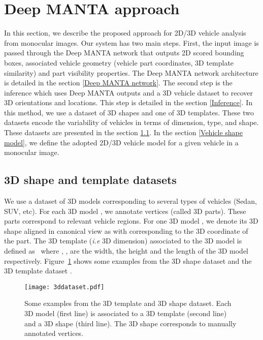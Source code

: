 \documentclass[10pt,twocolumn,letterpaper]{article}
\begin{document}
\section{Deep MANTA approach}  
\label{sec:method}

In this section, we describe the proposed approach for 2D/3D vehicle analysis from monocular images. Our system has two main steps. First, the input image is passed through the Deep MANTA network that outputs 2D scored bounding boxes, associated vehicle geometry (vehicle part coordinates, 3D template similarity) and part visibility properties. The Deep MANTA network architecture is detailed in the section \ref{Deep MANTA network}. The second step is the inference which uses Deep MANTA outputs and a 3D vehicle dataset to recover 3D orientations and locations. This step is detailed in the section  \ref{Inference}. 
In this method, we use a dataset of 3D shapes and one of 3D templates. These two datasets encode the variability of vehicles in terms of dimension, type, and shape. These datasets are presented in the section \ref{3dshapetemplate}. In the section \ref{Vehicle shape model}, we define the adopted 2D/3D vehicle model for a given vehicle in a monocular image. 


\subsection{3D shape and template datasets}
\label{3dshapetemplate}

We use a dataset of  3D models corresponding to several types of vehicles (Sedan, SUV, etc). For each 3D model , we annotate  vertices (called 3D parts). These parts correspond to relevant vehicle regions. For one 3D model , we denote its 3D shape aligned in canonical view as  with  corresponding to the 3D coordinate of the  part. The 3D template (\textit{i.e} 3D dimension) associated to the 3D model  is defined as~  where , ,  are the width, the height and the length of the 3D model respectively. Figure~\ref{fig:3ddataset} shows some examples from the 3D shape dataset  and the 3D template dataset . 

\begin{figure}[ht]
\texttt{[image: 3ddataset.pdf]}
\vspace{-3mm}
\caption{Some examples from the 3D template and 3D shape dataset. Each 3D model  (first line) is associated to a 3D template  (second line) and a 3D shape   (third line). The 3D shape corresponds to manually annotated vertices. }
\label{fig:3ddataset}
\end{figure}
\end{document}

